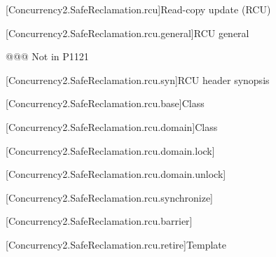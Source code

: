 
[Concurrency2.SafeReclamation.rcu]{Read-copy update (RCU)}

[Concurrency2.SafeReclamation.rcu.general]{RCU general}

@@@ Not in P1121

[Concurrency2.SafeReclamation.rcu.syn]{RCU header  synopsis}

[Concurrency2.SafeReclamation.rcu.base]{Class }

[Concurrency2.SafeReclamation.rcu.domain]{Class }

[Concurrency2.SafeReclamation.rcu.domain.lock]{}

[Concurrency2.SafeReclamation.rcu.domain.unlock]{}

[Concurrency2.SafeReclamation.rcu.synchronize]{}

[Concurrency2.SafeReclamation.rcu.barrier]{}

[Concurrency2.SafeReclamation.rcu.retire]{Template }

